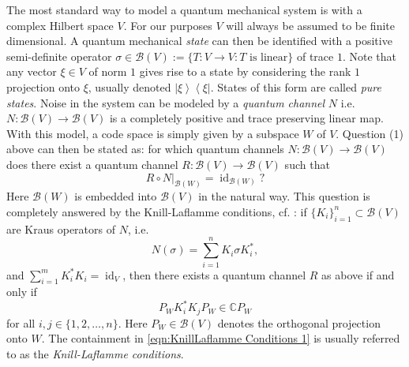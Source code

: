 \documentclass[11pt, oneside, reqno]{amsart}
\newcommand{\calB}{\mathcal{B}}
\newcommand{\bbC}{\mathbb{C}}
\newcommand{\id}{\operatorname{id}}
\newcommand{\bra}[1]{\left\langle#1\right|}
\newcommand{\ket}[1]{\left|#1\right\rangle}
\theoremstyle{definition}
\theoremstyle{plain}
\theoremstyle{remark}
\begin{document}
The most standard way to model a quantum mechanical system is with a complex Hilbert space $V$. For our purposes $V$ will always be assumed to be finite dimensional. A quantum mechanical \emph{state} can then be identified with a positive semi-definite operator $\sigma \in \calB(V) := \{ T \colon V \to V : T \text{ is linear} \}$ of trace $1$. Note that any vector $\xi \in V$ of norm $1$ gives rise to a state by considering the rank $1$ projection onto $\xi$, usually denoted $\ket{\xi}\bra{\xi}$. States of this form are called \emph{pure states}. Noise in the system can be modeled by a \emph{quantum channel} $N$ i.e. $N \colon \calB(V) \to \calB(V)$ is a completely positive and trace preserving linear map. With this model, a code space is simply given by a subspace $W$ of $V$. Question (1) above can then be stated as: for which quantum channels $N \colon \calB(V) \to \calB(V)$ does there exist a quantum channel $R \colon \calB(V) \to \calB(V)$ such that
\begin{equation*}
    R \circ N |_{\calB(W)} = \id_{\calB(W)}?
\end{equation*}
Here $\calB(W)$ is embedded into $\calB(V)$ in the natural way. This question is completely answered by the Knill-Laflamme conditions, cf. \cite{KnillLaflamme97}: if $\{K_i\}_{i=1}^{n} \subset \calB(V)$ are Kraus operators of $N$, i.e.
\begin{equation*}
    N(\sigma) = \sum_{i=1}^{n}K_i \sigma K_i^*,
\end{equation*}
and $\sum_{i=1}^{m}K_i^*K_i = \id_V$, then there exists a quantum channel $R$ as above if and only if 
\begin{equation}\label{eqn:KnillLaflamme Conditions 1}
    P_WK_i^*K_jP_W \in \bbC P_W
\end{equation}
for all $i,j \in \{1,2,\dots,n\}$. Here $P_W \in \calB(V)$ denotes the orthogonal projection onto $W$. The containment in \cref{eqn:KnillLaflamme Conditions 1} is usually referred to as the \emph{Knill-Laflamme conditions}.
\end{document}
